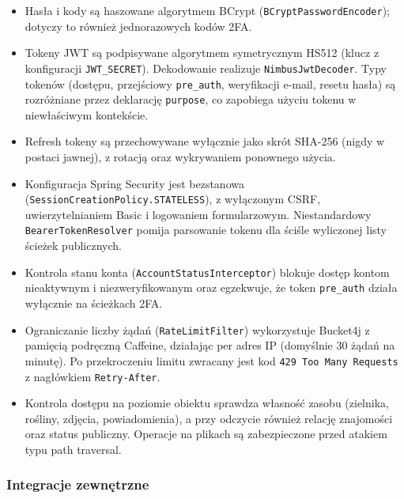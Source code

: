\documentclass[12pt,a4paper]{article}
\begin{document}
\begin{itemize}[label=\textbullet, leftmargin=1.5cm]
    \item Has\l{}a i kody s\k{a} haszowane algorytmem BCrypt (\texttt{BCryptPasswordEncoder}); dotyczy to r\'ownie\.z jednorazowych kod\'ow 2FA.
    \item Tokeny JWT s\k{a} podpisywane algorytmem symetrycznym HS512 (klucz z konfiguracji \texttt{JWT\_SECRET}). Dekodowanie realizuje \texttt{NimbusJwtDecoder}. Typy token\'ow (dost\k{e}pu, przej\'sciowy \texttt{pre\_auth}, weryfikacji e-mail, resetu has\l{}a) s\k{a} rozr\'o\.zniane przez deklaracj\k{e} \texttt{purpose}, co zapobiega u\.zyciu tokenu w niew\l{}a\'sciwym kontek\'scie.
    \item Refresh tokeny s\k{a} przechowywane wy\l{}\k{a}cznie jako skr\'ot SHA-256 (nigdy w postaci jawnej), z rotacj\k{a} oraz wykrywaniem ponownego u\.zycia.
    \item Konfiguracja Spring Security jest bezstanowa (\texttt{SessionCreationPolicy.\allowbreak{}STATELESS}), z wy\l{}\k{a}czonym CSRF, uwierzytelnianiem Basic i logowaniem formularzowym. Niestandardowy \texttt{BearerTokenResolver} pomija parsowanie tokenu dla \'sci\'sle wyliczonej listy \'scie\.zek publicznych.
    \item Kontrola stanu konta (\texttt{AccountStatusInterceptor}) blokuje dost\k{e}p kontom nieaktywnym i niezweryfikowanym oraz egzekwuje, \.ze token \texttt{pre\_auth} dzia\l{}a wy\l{}\k{a}cznie na \'scie\.zkach 2FA.
    \item Ograniczanie liczby \.z\k{a}da\'n (\texttt{RateLimitFilter}) wykorzystuje Bucket4j z pami\k{e}ci\k{a} podr\k{e}czn\k{a} Caffeine, dzia\l{}aj\k{a}c per adres IP (domy\'slnie 30 \.z\k{a}da\'n na minut\k{e}). Po przekroczeniu limitu zwracany jest kod \texttt{429 Too Many Requests} z nag\l{}\'owkiem \texttt{Retry-After}.
    \item Kontrola dost\k{e}pu na poziomie obiektu sprawdza w\l{}asno\'s\'c zasobu (zielnika, ro\'sliny, zdj\k{e}cia, powiadomienia), a przy odczycie r\'ownie\.z relacj\k{e} znajomo\'sci oraz status publiczny. Operacje na plikach s\k{a} zabezpieczone przed atakiem typu path traversal.
\end{itemize}

\subsubsection{Integracje zewn\k{e}trzne}
\end{document}
